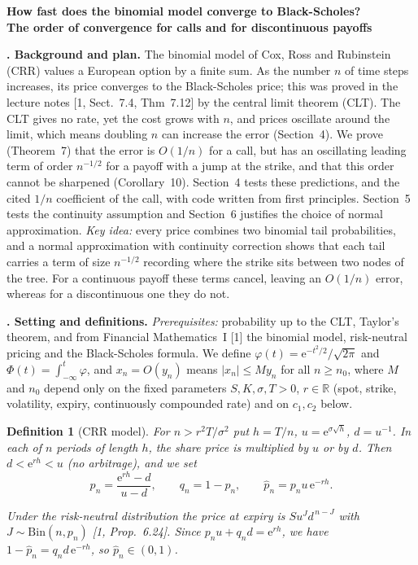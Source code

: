 \documentclass[11pt,a4paper]{article}
\theoremstyle{tight}
\theoremstyle{tightrm}
\newtheorem{defn}[thm]{Definition}
\newcounter{sect}\setcounter{sect}{-1}
\newcommand{\sect}[1]{\par\vspace{1.5pt}\noindent\stepcounter{sect}\textbf{\thesect. #1}\enspace}
\newcommand{\R}{\mathbb{R}}
\newcommand{\e}{\mathrm{e}}
\begin{document}
\begin{center}
{\Large\bfseries How fast does the binomial model converge to Black-Scholes?}\\[1pt]
{\large\bfseries The order of convergence for calls and for discontinuous payoffs}
\end{center}
\vspace{-7pt}
\sect{Background and plan.}
The binomial model of Cox, Ross and Rubinstein (CRR) values a European option by a finite sum. As the number $n$ of time steps increases, its price converges to the Black-Scholes price; this was proved in the lecture notes [1, Sect.~7.4, Thm~7.12] by the central limit theorem (CLT). The CLT gives no rate, yet the cost grows with $n$, and prices oscillate around the limit, which means doubling $n$ can increase the error (Section~4).
We prove (Theorem~7) that the error is $O(1/n)$ for a call, but has an oscillating leading term of order $n^{-1/2}$ for a payoff with a jump at the strike, and that this order cannot be sharpened (Corollary~10). Section~4 tests these predictions, and the cited $1/n$ coefficient of the call, with code written from first principles. Section~5 tests the continuity assumption and Section~6 justifies the choice of normal approximation.
\emph{Key idea:} every price combines two binomial tail probabilities, and a normal approximation with continuity correction shows that each tail carries a term of size $n^{-1/2}$ recording where the strike sits between two nodes of the tree. For a continuous payoff these terms cancel, leaving an $O(1/n)$ error, whereas for a discontinuous one they do not.

\sect{Setting and definitions.} 
\emph{Prerequisites:} probability up to the CLT, Taylor's theorem, and from Financial Mathematics~I [1] the binomial model, risk-neutral pricing and the Black-Scholes formula. We define $\varphi(t)=\e^{-t^2/2}/\sqrt{2\pi}$ and $\Phi(t)=\int_{-\infty}^{t}\varphi$, and $x_n=O(y_n)$ means $|x_n|\le My_n$ for all $n\ge n_0$, where
$M$ and $n_0$ depend only on the fixed parameters $S,K,\sigma,T>0$, $r\in\R$ (spot, strike, volatility, expiry, continuously compounded rate) and on $c_1,c_2$ below.

\begin{defn}[CRR model]
For $n> r^2T/\sigma^2$ put $h=T/n$, $u=\e^{\sigma\sqrt h}$, $d=u^{-1}$. In each of $n$ periods of length $h$, the share price is multiplied by $u$ or by $d$. Then $d<\e^{rh}<u$ (no arbitrage), and we set
\[
p_n=\frac{\e^{rh}-d}{u-d},\qquad q_n=1-p_n,\qquad \hat p_n=p_nu\,\e^{-rh}.
\]

Under the risk-neutral distribution the price at expiry is $Su^{J}d^{\,n-J}$ with $J\sim\mathrm{Bin}(n,p_n)$ [1, Prop.~6.24]. Since $p_nu+q_nd=\e^{rh}$, we have $1-\hat p_n=q_nd\,\e^{-rh}$, so $\hat p_n\in(0,1)$.
\end{defn}
\end{document}
